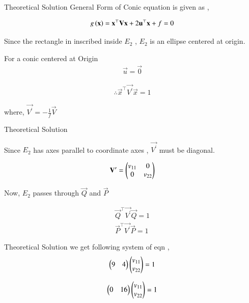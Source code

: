 \documentclass{beamer}
\begin{document}
\begin{frame}{Theoretical Solution}
    General Form of Conic equation is given as , 
    
    \begin{align}
        g\left(\mathbf{x}\right) = \mathbf{x}^{\top}\mathbf{V}\mathbf{x} + 2\mathbf{u}^{\top}\mathbf{x} + f = 0 
    \end{align}
    
    Since the rectangle in inscribed inside $E_2$ , $E_2$ is an ellipse centered at origin. 
    
    For a conic centered at Origin 
    \begin{align}
        \vec{u} = \vec{0}    
    \end{align}
    
    \begin{align}
        \therefore \vec{x}^{\top}\vec{V^{\prime}}\vec{x} = 1  \label{eq_3}
    \end{align}
    
    where, $\vec{V^{\prime}} = -\frac{1}{f}\vec{V}$
\end{frame}

\begin{frame}{Theoretical Solution}

    Since $E_2$ has axes parallel to coordinate axes , $\vec{V^{\prime}}$ must be diagonal.
    
    \begin{align}
        \mathbf{V^{\prime}} = \begin{pmatrix}v_{11} & 0 \\ 0 & v_{22}\end{pmatrix}
    \end{align}
    
    Now, $E_2$ passes through $\vec{Q}$ and $\vec{P}$
    
    \begin{align}
        \vec{Q}^{\top}\vec{V^{\prime}}\vec{Q} = 1 \\ 
        \vec{P}^{\top}\vec{V^{\prime}}\vec{P} = 1 
    \end{align}
\end{frame}
\begin{frame}{Theoretical Solution}
    we get following system of eqn , 
    \begin{align}
        \begin{pmatrix}9 & 4 \end{pmatrix}\begin{pmatrix}v_{11} \\ v_{22}\end{pmatrix} = 1    
    \end{align}
    
    \begin{align}
        \begin{pmatrix}0 & 16 \end{pmatrix}\begin{pmatrix}v_{11} \\ v_{22}\end{pmatrix} = 1    
    \end{align}
\end{frame}
\end{document}
